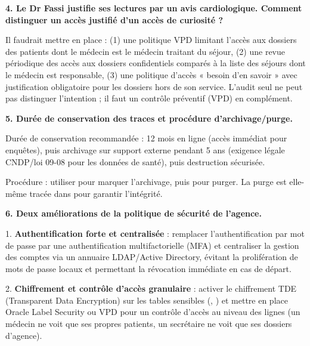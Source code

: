 \textbf{4. Le Dr Fassi justifie ses lectures par un avis cardiologique. Comment distinguer un accès justifié d'un accès de curiosité ?}

Il faudrait mettre en place : (1) une politique VPD limitant l'accès aux dossiers des patients dont le médecin est le médecin traitant du séjour, (2) une revue périodique des accès aux dossiers confidentiels comparés à la liste des séjours dont le médecin est responsable, (3) une politique d'accès « besoin d'en savoir » avec justification obligatoire pour les dossiers hors de son service. L'audit seul ne peut pas distinguer l'intention ; il faut un contrôle préventif (VPD) en complément.

\textbf{5. Durée de conservation des traces et procédure d'archivage/purge.}

Durée de conservation recommandée : 12 mois en ligne (accès immédiat pour enquêtes), puis archivage sur support externe pendant 5 ans (exigence légale CNDP/loi 09-08 pour les données de santé), puis destruction sécurisée.

Procédure : utiliser  pour marquer l'archivage, puis  pour purger. La purge est elle-même tracée dans  pour garantir l'intégrité.

\textbf{6. Deux améliorations de la politique de sécurité de l'agence.}

1. \textbf{Authentification forte et centralisée} : remplacer l'authentification par mot de passe par une authentification multifactorielle (MFA) et centraliser la gestion des comptes via un annuaire LDAP/Active Directory, évitant la prolifération de mots de passe locaux et permettant la révocation immédiate en cas de départ.

2. \textbf{Chiffrement et contrôle d'accès granulaire} : activer le chiffrement TDE (Transparent Data Encryption) sur les tables sensibles (, ) et mettre en place Oracle Label Security ou VPD pour un contrôle d'accès au niveau des lignes (un médecin ne voit que ses propres patients, un secrétaire ne voit que ses dossiers d'agence).
